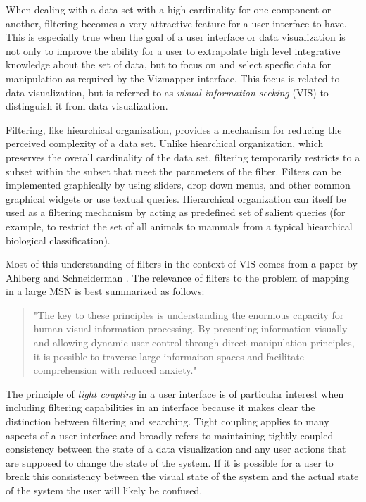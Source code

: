 When dealing with a data set with a high cardinality for one component or another, filtering becomes a very attractive feature for a user interface to have. This is especially true when the goal of a user interface or data visualization is not only to improve the ability for a user to extrapolate high level integrative knowledge about the set of data, but to focus on and select specfic data for manipulation as required by the Vizmapper interface. This focus is related to data visualization, but is referred to as \emph{visual information seeking} (VIS) to distinguish it from data visualization. 

Filtering, like hiearchical organization, provides a mechanism for reducing the perceived complexity of a data set. Unlike hiearchical organization, which preserves the overall cardinality of the data set, filtering temporarily restricts to a subset within the subset that meet the parameters of the filter. Filters can be implemented graphically by using sliders, drop down menus, and other common graphical widgets or use textual queries. Hierarchical organization can itself be used as a filtering mechanism by acting as predefined set of salient queries (for example, to restrict the set of all animals to mammals from a typical hiearchical biological classification).

Most of this understanding of filters in the context of VIS comes from a paper by Ahlberg and Schneiderman \cite{seeking1994}. The relevance of filters to the problem of mapping in a large MSN is best summarized as follows:

\begin{quote}
"The key to these principles is understanding the enormous capacity for human visual information processing. By presenting information visually and allowing dynamic user control through direct manipulation principles, it is possible to traverse large informaiton spaces and facilitate comprehension with reduced anxiety." \cite{seeking1994}
\end{quote}

The principle of \emph{tight coupling} in a user interface is of particular interest when including filtering capabilities in an interface because it makes clear the distinction between filtering and searching. Tight coupling applies to many aspects of a user interface and broadly refers to maintaining tightly coupled consistency between the state of a data visualization and any user actions that are supposed to change the state of the system. If it is possible for a user to break this consistency between the visual state of the system and the actual state of the system the user will likely be confused. 

